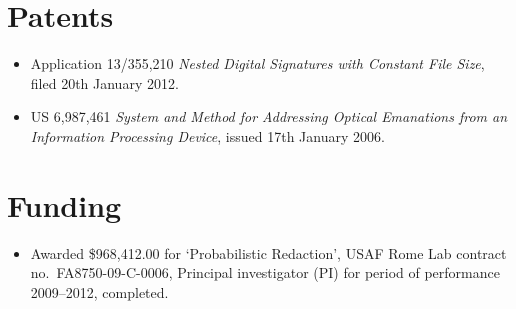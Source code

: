 \documentclass[letterpaper]{article}
\begin{document}
\section*{Patents} %

\begin{itemize}
	\item Application 13/355,210 \emph{Nested Digital Signatures with Constant File Size},
		filed 20th January 2012.

    \item US 6,987,461 \emph{System and Method for Addressing Optical
		Emanations from an Information Processing Device}, issued 17th January 2006.
\end{itemize}

\section*{Funding}

\begin{itemize}
	\item Awarded \$968,412.00 for `Probabilistic Redaction', USAF Rome Lab contract
	no.\ FA8750-09-C-0006, Principal investigator (PI) for period of performance
	2009--2012, completed.
\end{itemize}
\end{document}
